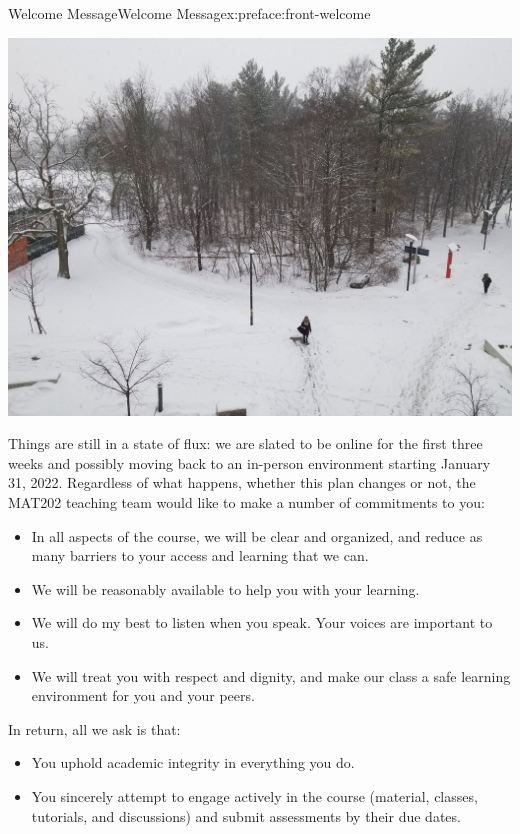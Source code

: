 \documentclass[oneside,10pt,]{book}
\numberwithin{equation}{section}
\begin{document}
\begin{preface}{Welcome Message}{}{Welcome Message}{}{}{x:preface:front-welcome}
\begin{sidebyside}{1}{0.15}{0.15}{0}
\begin{sbspanel}{0.7}%
\includegraphics[width=\linewidth]{figs/UTMwinter.jpg}
\end{sbspanel}%
\end{sidebyside}%
\par
Things are still in a state of flux: we are slated to be online for the first three weeks and possibly moving back to an in-person environment starting January 31, 2022. Regardless of what happens, whether this plan changes or not, the MAT202 teaching team would like to make a number of commitments to you:%
\begin{itemize}[label=\textbullet]
\item{}In all aspects of the course, we will be clear and organized, and reduce as many barriers to your access and learning that we can.%
\item{}We will be reasonably available to help you with your learning.%
\item{}We will do my best to listen when you speak. Your voices are important to us.%
\item{}We will treat you with respect and dignity, and make our class a safe learning environment for you and your peers.%
\end{itemize}
In return, all we ask is that:%
\begin{itemize}[label=\textbullet]
\item{}You uphold academic integrity in everything you do.%
\item{}You sincerely attempt to engage actively in the course (material, classes, tutorials, and discussions) and submit assessments by their due dates.%

\end{itemize}
\end{preface}
\end{document}
